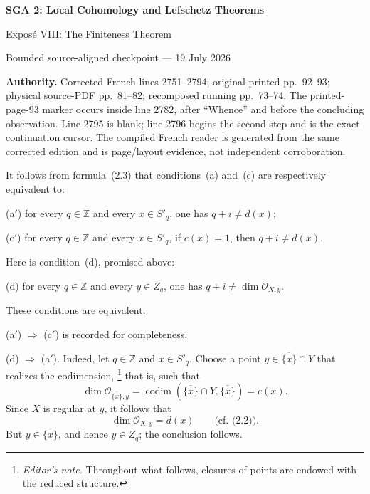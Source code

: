 \documentclass[10pt,a4paper]{article}
\newcommand{\cO}{\mathcal O}
\newcommand{\codim}{\operatorname{codim}}
\newcommand{\markedfootnote}[2]{%
  \begingroup\renewcommand{\thefootnote}{#1}\footnote{#2}\endgroup}
\begin{document}
\begin{center}
  {\Large\bfseries SGA 2: Local Cohomology and Lefschetz Theorems}\par\smallskip
  {\large Expos\'e VIII: The Finiteness Theorem}\par
  \small Bounded source-aligned checkpoint --- 19 July 2026
\end{center}
\noindent\colorbox{softgray}{\parbox{0.95\linewidth}{\footnotesize\textbf{Authority.}
Corrected French lines 2751--2794; original printed pp.~92--93; physical
source-PDF pp.~81--82; recomposed running pp.~73--74. The printed-page-93
marker occurs inside line 2782, after ``Whence'' and before the concluding
observation. Line 2795 is blank; line 2796 begins the second step and is the
exact continuation cursor. The compiled French reader is generated from the
same corrected edition and is page/layout evidence, not independent
corroboration.}}

\medskip
It follows from formula~(2.3) that conditions~(a) and~(c) are respectively
equivalent to:

\medskip
\noindent\textup{(a$'$)} for every $q\in\mathbb Z$ and every $x\in S'_q$,
one has $q+i\ne d(x)$;

\smallskip
\noindent\textup{(c$'$)} for every $q\in\mathbb Z$ and every $x\in S'_q$,
if $c(x)=1$, then $q+i\ne d(x)$.

\medskip
\noindent Here is condition~(d), promised above:

\medskip
\noindent\textup{(d)} for every $q\in\mathbb Z$ and every $y\in Z_q$,
one has $q+i\ne\dim\cO_{X,y}$.

\medskip
\noindent These conditions are equivalent.

\smallskip
\noindent\textup{(a$'$)} $\Rightarrow$ \textup{(c$'$)} is recorded for
completeness.

\smallskip
\noindent\textup{(d)} $\Rightarrow$ \textup{(a$'$)}. Indeed, let
$q\in\mathbb Z$ and $x\in S'_q$. Choose a point
$y\in\overline{\{x\}}\cap Y$ that realizes the
codimension,\markedfootnote{(6)}{\textit{Editor's note.} Throughout what
follows, closures of points are endowed with the reduced structure.} that is,
such that
\begin{equation}
  \dim\cO_{\overline{\{x\}},y}
  =\codim(\overline{\{x\}}\cap Y,\overline{\{x\}})=c(x).
  \tag{2.5}
\end{equation}
Since $X$ is regular at $y$, it follows that
\begin{equation}
  \dim\cO_{X,y}=d(x)\qquad\text{(cf.~(2.2)).}
  \tag{2.6}
\end{equation}
But $y\in\overline{\{x\}}$, and hence $y\in Z_q$; the conclusion follows.
\end{document}
